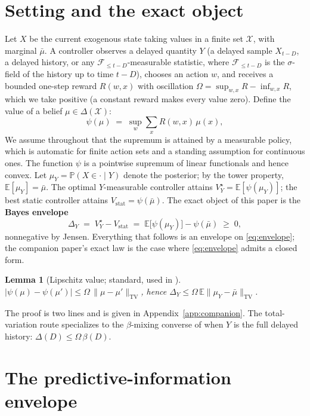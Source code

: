 \documentclass[11pt]{article}
\newtheorem{lemma}[theorem]{Lemma}
\newcommand{\TV}{\mathrm{TV}}
\newcommand{\E}{\mathbb{E}}
\begin{document}
\section{Setting and the exact object}\label{sec:envelope}

Let $X$ be the current exogenous state taking values in a finite set
$\mathcal X$, with marginal $\bar\mu$. A controller observes a delayed
quantity $Y$ (a delayed sample $X_{t-D}$, a delayed history, or any
$\mathcal F_{\le t-D}$-measurable statistic, where $\mathcal F_{\le t-D}$
is the $\sigma$-field of the history up to time $t-D$), chooses an action
$w$, and receives a bounded one-step reward $R(w,x)$ with oscillation
$\Omega=\sup_{w,x}R-\inf_{w,x}R$, which we take positive (a constant
reward makes every value zero). Define the value of a belief
$\mu\in\Delta(\mathcal X)$:
\[
\psi(\mu)\;=\;\sup_{w}\sum_{x}R(w,x)\,\mu(x),
\]
We assume throughout that the supremum is attained by a measurable
policy, which is automatic for finite action sets and a standing
assumption for continuous ones. The function $\psi$ is a pointwise
supremum of linear functionals and hence convex. Let
$\mu_Y=\mathbb P(X\in\cdot\mid Y)$ denote the posterior; by the tower
property, $\E[\mu_Y]=\bar\mu$. The optimal $Y$-measurable controller attains
$V^\star_Y=\E[\psi(\mu_Y)]$; the best static controller attains
$V_{\mathrm{stat}}=\psi(\bar\mu)$. The exact object of this paper is the
\textbf{Bayes envelope}
\begin{equation}\label{eq:envelope}
\Delta_Y \;=\; V^\star_Y - V_{\mathrm{stat}}
\;=\; \E\bigl[\psi(\mu_Y)\bigr]-\psi(\bar\mu)\;\ge\;0,
\end{equation}
nonnegative by Jensen. Everything that follows is an envelope on
\eqref{eq:envelope}; the companion paper's exact law is the case where
\eqref{eq:envelope} admits a closed form.

\begin{lemma}[Lipschitz value; standard, used in {\cite[App.~A]{infocom}}]\label{lem:lip}
$|\psi(\mu)-\psi(\mu')|\le\Omega\,\|\mu-\mu'\|_{\TV}$, hence
$\Delta_Y\le\Omega\,\E\|\mu_Y-\bar\mu\|_{\TV}$.
\end{lemma}

The proof is two lines and is given in Appendix~\ref{app:companion}.
The total-variation route specializes to the $\beta$-mixing converse of
\cite{infocom} when $Y$ is the full delayed history:
$\Delta(D)\le\Omega\,\beta(D)$.

\section{The predictive-information envelope}\label{sec:mi}
\end{document}
